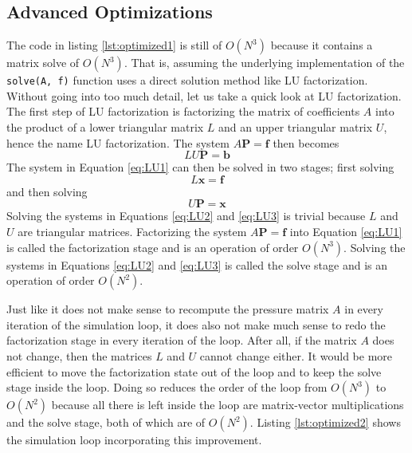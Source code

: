 \subsection{Advanced Optimizations}

The code in listing \ref{lst:optimized1} is still of $O(N^3)$ because it contains a matrix solve of $O(N^3)$. That is, assuming the underlying implementation of the \lstinline|solve(A, f)| function uses a direct solution method like LU factorization. Without going into too much detail, let us take a quick look at LU factorization. The first step of LU factorization is factorizing the matrix of coefficients $A$ into the product of a lower triangular matrix $L$ and an upper triangular matrix $U$, hence the name LU factorization. The system $A \mathbf{P} = \mathbf{f}$ then becomes
\begin{equation}
    \label{eq:LU1}
    LU \mathbf{P} = \mathbf{b}
\end{equation}
The system in Equation \eqref{eq:LU1} can then be solved in two stages; first  solving
\begin{equation}
    \label{eq:LU2}
    L \mathbf{x} = \mathbf{f}
\end{equation}
and then solving
\begin{equation}
    \label{eq:LU3}
    U \mathbf{P} = \mathbf{x}
\end{equation}
Solving the systems in Equations \eqref{eq:LU2} and \eqref{eq:LU3} is trivial because $L$ and $U$ are triangular matrices. Factorizing the system $A \mathbf{P} = \mathbf{f}$ into  Equation \eqref{eq:LU1} is called the factorization stage and is an operation of order $O(N^3)$. Solving the systems in Equations \eqref{eq:LU2} and \eqref{eq:LU3} is called the solve stage and is an operation of order $O(N^2)$.

Just like it does not make sense to recompute the pressure matrix $A$ in every iteration of the simulation loop, it does also not make much sense to redo the factorization stage in every iteration of the loop. After all, if the matrix $A$ does not change, then the matrices $L$ and $U$ cannot change either. It would be more efficient to move the factorization state out of the loop and to keep the solve stage inside the loop. Doing so reduces the order of the loop from $O(N^3)$ to $O(N^2)$ because all there is left inside the loop are matrix-vector multiplications and the solve stage, both of which are of $O(N^2)$. Listing \ref{lst:optimized2} shows the simulation loop incorporating this improvement.

